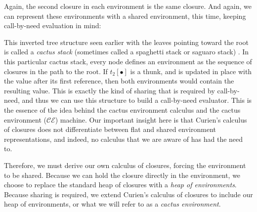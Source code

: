 \begin{center}
\end{center}

Again, the second closure in each environment is the same closure.  And again,
we can represent these environments with a shared environment, this time,
keeping call-by-need evaluation in mind:
\begin{center}
\end{center}
This inverted tree structure seen earlier with the leaves pointing toward the
root is called a \emph{cactus stack} (sometimes called a spaghetti stack or
saguaro stack) \cite{hauck1968burroughs,ichbiah1991rationale}. In this
particular cactus stack, every node defines an environment as the sequence of
closures in the path to the root.  If $t_2[\bullet]$ is a thunk, and is updated
in place with the value after its first reference, then both environments would
contain the resulting value. This is exactly the kind of sharing that is
required by call-by-need, and thus we can use this structure to build a
call-by-need evaluator. This is the essence of the idea behind the cactus
environment calculus and the cactus environment ($\mathcal{CE}$) machine. Our
important insight here is that Curien's calculus of closures does not
differentiate between flat and shared environment representations, and indeed,
no calculus that we are aware of has had the need to.

Therefore, we must derive our own calculus of closures, forcing the environment
to be shared. Because we can hold the closure directly in the environment, we
choose to replace the standard heap of closures with a \emph{heap of
environments}. Because sharing is required, we extend Curien's calculus of
closures to include our heap of environments, or what we will refer to as a
\emph{cactus environment}. 

